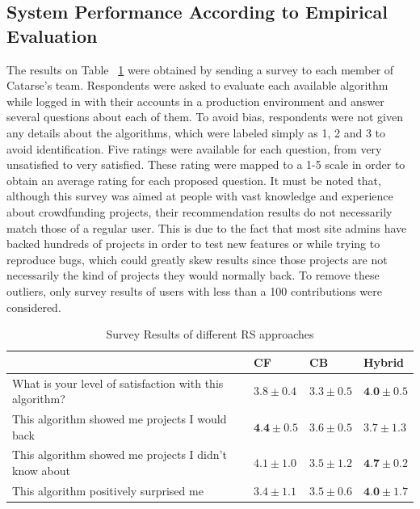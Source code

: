 \documentclass[cic,tc,english]{iiufrgs}
\begin{document}
\subsection{System Performance According to Empirical Evaluation}
\label{empirical-evaluation}

The results on Table ~\ref{tbl:survey-results} were obtained by sending a survey to each member of Catarse's team. Respondents were asked to evaluate each available algorithm while logged in with their accounts in a production environment and answer several questions about each of them. To avoid bias, respondents were not given any details about the algorithms, which were labeled simply as 1, 2 and 3 to avoid identification. Five ratings were available for each question, from very unsatisfied to very satisfied. These rating were mapped to a 1-5 scale in order to obtain an average rating for each proposed question. It must be noted that, although this survey was aimed at people with vast knowledge and experience about crowdfunding projects, their recommendation results do not necessarily match those of a regular user. This is due to the fact that most site admins have backed hundreds of projects in order to test new features or while trying to reproduce bugs, which could greatly skew results since those projects are not necessarily the kind of projects they would normally back. To remove these outliers, only survey results of users with less than a 100 contributions were considered. 
\begin{table}[ht!]
\centering
\caption{Survey Results of different RS approaches}
\label{tbl:survey-results}
\begin{tabular}{llll}
\hline
\multicolumn{1}{|l|}{}                                                        & \multicolumn{1}{l|}{CF} & \multicolumn{1}{l|}{CB} & \multicolumn{1}{l|}{Hybrid} \\ \hline
\multicolumn{1}{|l|}{What is your level of satisfaction with this algorithm?} & \multicolumn{1}{l|}{$3.8\pm 0.4$}  & \multicolumn{1}{l|}{$3.3 \pm 0.5$}  & \multicolumn{1}{l|}{$\textbf{4.0} \pm 0.5$}      \\ \hline
\multicolumn{1}{|l|}{This algorithm showed me projects I would back}          & \multicolumn{1}{l|}{$\textbf{4.4} \pm 0.5$}  & \multicolumn{1}{l|}{$3.6 \pm 0.5$}  & \multicolumn{1}{l|}{$3.7 \pm 1.3$}      \\ \hline
\multicolumn{1}{|l|}{This algorithm showed me projects I didn't know about}   & \multicolumn{1}{l|}{$4.1 \pm 1.0$}  & \multicolumn{1}{l|}{$3.5 \pm 1.2$}  & \multicolumn{1}{l|}{$\textbf{4.7} \pm 0.2$}      \\ \hline
\multicolumn{1}{|l|}{This algorithm positively surprised me}   & \multicolumn{1}{l|}{$3.4 \pm 1.1$}  & \multicolumn{1}{l|}{$3.5 \pm 0.6$}  & \multicolumn{1}{l|}{$\textbf{4.0} \pm 1.7$}      \\ \hline
\end{tabular}
\end{table}
\end{document}
